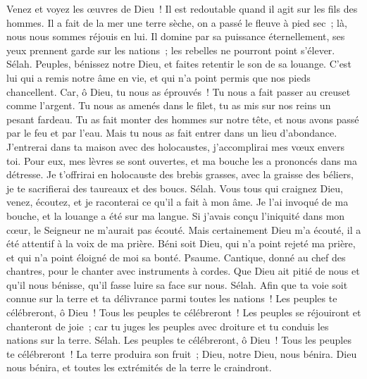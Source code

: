 \begin{multicols}{2}
Venez et voyez les œuvres de Dieu~! Il est redoutable quand il agit sur les fils des hommes.
Il a fait de la mer une terre sèche, on a passé le fleuve à pied sec~; là, nous nous sommes réjouis en lui.
Il domine par sa puissance éternellement, ses yeux prennent garde sur les nations~; les rebelles ne pourront point s'élever. Sélah.
Peuples, bénissez notre Dieu, et faites retentir le son de sa louange.
C'est lui qui a remis notre âme en vie, et qui n'a point permis que nos pieds chancellent.
Car, ô Dieu, tu nous as éprouvés~! Tu nous a fait passer au creuset comme l'argent.
Tu nous as amenés dans le filet, tu as mis sur nos reins un pesant fardeau.
Tu as fait monter des hommes sur notre tête, et nous avons passé par le feu et par l'eau. Mais tu nous as fait entrer dans un lieu d'abondance.
J'entrerai dans ta maison avec des holocaustes, j'accomplirai mes vœux envers toi.
Pour eux, mes lèvres se sont ouvertes, et ma bouche les a prononcés dans ma détresse.
Je t'offrirai en holocauste des brebis grasses, avec la graisse des béliers, je te sacrifierai des taureaux et des boucs. Sélah.
Vous tous qui craignez Dieu, venez, écoutez, et je raconterai ce qu'il a fait à mon âme.
Je l'ai invoqué de ma bouche, et la louange a été sur ma langue.
Si j'avais conçu l'iniquité dans mon cœur, le Seigneur ne m'aurait pas écouté.
Mais certainement Dieu m'a écouté, il a été attentif à la voix de ma prière.
Béni soit Dieu, qui n'a point rejeté ma prière, et qui n'a point éloigné de moi sa bonté.
\VerseOne{}Psaume. Cantique, donné au chef des chantres, pour le chanter avec instruments à cordes.
Que Dieu ait pitié de nous et qu'il nous bénisse, qu'il fasse luire sa face sur nous. Sélah.
Afin que ta voie soit connue sur la terre et ta délivrance parmi toutes les nations~!
Les peuples te célébreront, ô Dieu~! Tous les peuples te célébreront~!
Les peuples se réjouiront et chanteront de joie~; car tu juges les peuples avec droiture et tu conduis les nations sur la terre. Sélah.
Les peuples te célébreront, ô Dieu~! Tous les peuples te célébreront~!
La terre produira son fruit~; Dieu, notre Dieu, nous bénira.
Dieu nous bénira, et toutes les extrémités de la terre le craindront.

\end{multicols}
